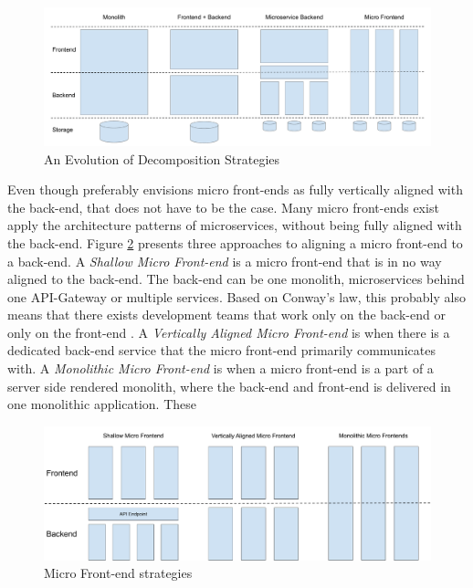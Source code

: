 \begin{figure}
    \centering
    \includegraphics[width=\linewidth]{images/evolution-of-decomposition-strategies.pdf}
    \caption{An Evolution of Decomposition Strategies}
    \label{fig:evolution-of-decomposition-strategies}
\end{figure}

Even though \citeauthor{Geers2020} preferably envisions micro front-ends as fully vertically aligned with the back-end, that does not have to be the case. Many micro front-ends exist apply the architecture patterns of microservices, without being fully aligned with the back-end. Figure \ref{fig:micro-frontend-alignment} presents three approaches to aligning a micro front-end to a back-end. A \textit{Shallow Micro Front-end} is a micro front-end that is in no way aligned to the back-end. The back-end can be one monolith, microservices behind one API-Gateway or multiple services. Based on Conway's law, this probably also means that there exists development teams that work only on the back-end or only on the front-end \cites{Conway}. A \textit{Vertically Aligned Micro Front-end} is when there is a dedicated back-end service that the micro front-end primarily communicates with. A \textit{Monolithic Micro Front-end} is when a micro front-end is a part of a server side rendered monolith, where the back-end and front-end is delivered in one monolithic application. These

\begin{figure}
    \centering
    \includegraphics[width=\linewidth]{images/micro-frontend-strategies.pdf}
    \caption{Micro Front-end strategies}
    \label{fig:micro-frontend-alignment}
\end{figure}


